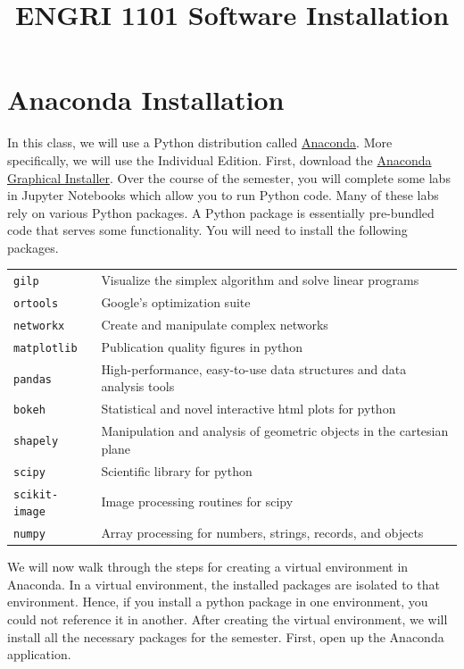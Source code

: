 \documentclass[11 pt]{article}
\title{ENGRI 1101 Software Installation}
\date{}
\begin{document}
\maketitle

\section{Anaconda Installation}

In this class, we will use a Python distribution called \href{https://www.anaconda.com/}{Anaconda}. More specifically, we will use the Individual Edition. First, download the \href{https://www.anaconda.com/products/individual}{Anaconda Graphical Installer}. Over the course of the semester, you will complete some labs in Jupyter Notebooks which allow you to run Python code. Many of these labs rely on various Python packages. A Python package is essentially pre-bundled code that serves some functionality. You will need to install the following packages. 

\begin{center}
\begin{tabular}{ll}
 \texttt{gilp} & Visualize the simplex algorithm and solve linear programs \\
 \texttt{ortools} & Google's optimization suite \\
 \texttt{networkx} &  Create and manipulate complex networks \\
 \texttt{matplotlib} & Publication quality figures in python \\
 \texttt{pandas} & High-performance, easy-to-use data structures and data analysis tools \\
 \texttt{bokeh} & Statistical and novel interactive html plots for python \\
 \texttt{shapely} & Manipulation and analysis of geometric objects in the cartesian plane \\
 \texttt{scipy} & Scientific library for python \\
 \texttt{scikit-image} & Image processing routines for scipy \\
 \texttt{numpy} & Array processing for numbers, strings, records, and objects \\
\end{tabular}
\end{center}

We will now walk through the steps for creating a virtual environment in Anaconda. In a virtual environment, the installed packages are isolated to that environment. Hence, if you install a python package in one environment, you could not reference it in another. After creating the virtual environment, we will install all the necessary packages for the semester. First, open up the Anaconda application.
\end{document}

